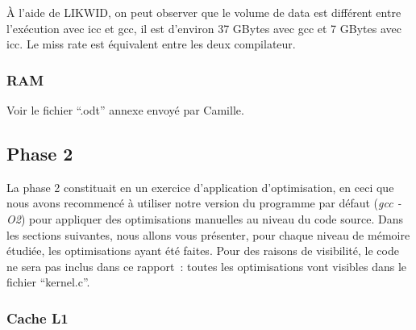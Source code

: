 \documentclass[12pt,a4paper]{article}
\begin{document}
À l'aide de LIKWID, on peut observer que le volume de data est différent 
entre l’exécution avec icc et gcc, il est d'environ 37 GBytes avec gcc et
7 GBytes avec icc. Le miss rate est équivalent entre les deux compilateur.

\subsubsection{RAM}

Voir le fichier \enquote{.odt} annexe envoyé par Camille.

\newpage
\subsection{Phase 2}

La phase 2 constituait en un exercice d'application d'optimisation, en ceci que
nous avons recommencé à utiliser notre version du programme par défaut
(\textit{gcc -O2}) pour appliquer des optimisations manuelles au niveau du code
source. Dans les sections suivantes, nous allons vous présenter, pour chaque
niveau de mémoire étudiée, les optimisations ayant été faites. Pour des raisons de
visibilité, le code ne sera pas inclus dans ce rapport : toutes les optimisations
vont visibles dans le fichier \enquote{kernel.c}.

\subsubsection{Cache L1}
\end{document}
